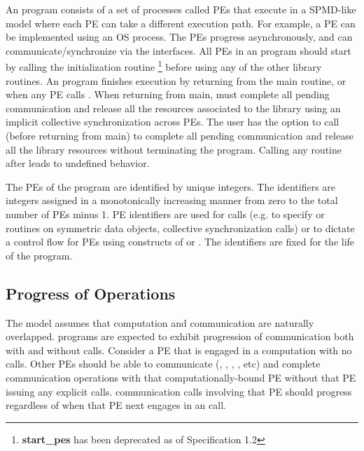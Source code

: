 An \openshmem program consists of a set of \openshmem processes called \acp{PE}
that execute in a \ac{SPMD}-like model where each \ac{PE} can take a different
execution path. For example, a \ac{PE} can be implemented using an OS
process.  The \acp{PE} progress asynchronously, and can communicate/synchronize
via the \openshmem interfaces.  All \acp{PE} in an \openshmem program should
start by calling the initialization routine  
\footnote{\textbf{start\_pes} has been deprecated as of Specification 1.2}
before using any of the other \openshmem library routines.  An \openshmem
program finishes execution by returning from the main routine, or when any PE
calls . When returning from main, \openshmem must
complete all pending communication and release all the resources associated to
the library using an implicit collective synchronization across PEs. The user
has the option to call  (before returning from main) to
complete all pending communication and release all the \openshmem library
resources without terminating the program. Calling any \openshmem routine after
 leads to undefined behavior.

The \acp{PE} of the \openshmem program are identified by unique integers.  The
identifiers are integers assigned in a monotonically increasing manner from zero
to the total number of \acp{PE} minus 1. \ac{PE} identifiers are used for
\openshmem calls (e.g. to specify  or  routines on symmetric
data objects, collective synchronization calls) or to dictate a control flow for
\acp{PE} using constructs of \Cstd or \Fortran. The identifiers are fixed for
the life of the \openshmem program.

\subsection{Progress of \openshmem Operations}\label{subsec:progress}

The \openshmem model assumes that computation and communication are naturally
overlapped. \openshmem programs are expected to exhibit progression of
communication both with and without \openshmem calls. Consider a \ac{PE} that is
engaged in a computation with no \openshmem calls. Other \acp{PE} should be able
to communicate (, , , , etc) and
complete communication operations with that computationally-bound \ac{PE}
without that \ac{PE} issuing any explicit \openshmem calls. \openshmem
communication calls involving that \ac{PE} should progress regardless of when
that \ac{PE} next engages in an \openshmem call.

